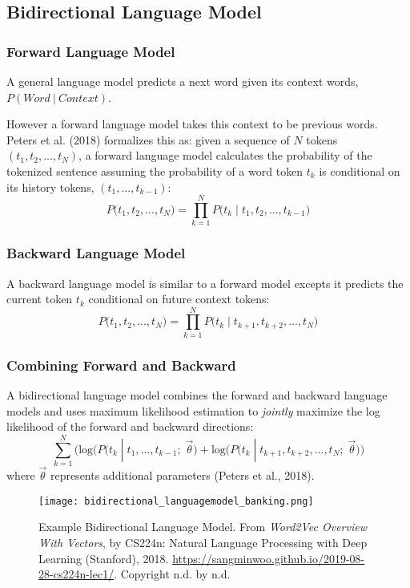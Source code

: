 \subsection{Bidirectional Language Model}

\subsubsection{Forward Language Model}

A general language model predicts a next word given its context words, $P(\textit{Word} \: | \: \textit{Context})$. 

However a forward language model takes this context to be previous words. Peters et al. (2018) formalizes this as:  given a sequence of $N$ tokens $(t_1, t_2, ..., t_N)$, a forward language model calculates the probability of the tokenized sentence assuming the probability of a word token $t_k$ is conditional on its history tokens, $(t_1, ..., t_{k-1})$:
$$
P \Big(t_1, t_2, ..., t_N \Big) = \prod_{k=1}^N P \Big(t_k \; | \; t_1, t_2, ..., t_{k-1} \Big)
$$

\subsubsection{Backward Language Model}

A backward language model is similar to a forward model excepts it predicts the current token $t_k$ conditional on future context tokens:
$$
P \Big(t_1, t_2, ..., t_N \Big) = \prod_{k=1}^N P \Big(t_k \; | \; t_{k+1}, t_{k+2}, ..., t_N \Big)
$$

\subsubsection{Combining Forward and Backward}

A bidirectional language model combines the forward and backward language models and uses maximum likelihood estimation to \emph{jointly} maximize the log likelihood of the forward and backward directions: 
$$
\sum_{k=1}^N \Big( \text{log} \Big( P \Big(t_k \; | \; t_1,...,t_{k-1}; \; \overrightarrow{\theta} \Big) + \text{log} \Big( P \Big(t_k \; | \; t_{k+1}, t_{k+2}, ..., t_N; \; \overrightarrow{\theta} \Big) \Big)
$$
where $\overrightarrow{\theta}$ represents additional parameters (Peters et al., 2018). 


\begin{figure}[h]
\centering
\texttt{[image: bidirectional\_languagemodel\_banking.png]}
\caption{Example Bidirectional Language Model. From \emph{Word2Vec Overview With Vectors}, by CS224n: Natural Language Processing with Deep Learning (Stanford), 2018. \url{https://sangminwoo.github.io/2019-08-28-cs224n-lec1/}. Copyright n.d. by n.d.}
\end{figure}

